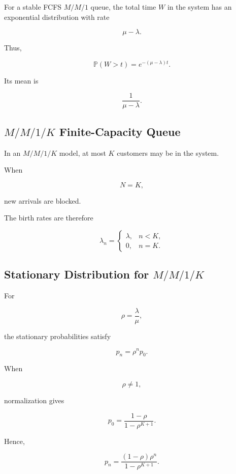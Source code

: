 For a stable FCFS \(M/M/1\) queue, the total time \(W\) in the system has
an exponential distribution with rate

\[
\mu-\lambda.
\]

Thus,

\[
\boxed{
\mathbb{P}(W>t)
=
e^{-(\mu-\lambda)t}.
}
\]

Its mean is

\[
\boxed{
\frac1{\mu-\lambda}.
}
\]

\subsection{\(M/M/1/K\) Finite-Capacity Queue}
\label{subsec:mm1k}

In an \(M/M/1/K\) model, at most \(K\) customers may be in the system.

When

\[
N=K,
\]

new arrivals are blocked.

The birth rates are therefore

\[
\lambda_n
=
\begin{cases}
\lambda,
&
n<K,
\\
0,
&
n=K.
\end{cases}
\]

\subsection{Stationary Distribution for \(M/M/1/K\)}
\label{subsec:mm1k-stationary}

For

\[
\rho
=
\frac{\lambda}{\mu},
\]

the stationary probabilities satisfy

\[
p_n
=
\rho^n p_0.
\]

When

\[
\rho\neq1,
\]

normalization gives

\[
\boxed{
p_0
=
\frac{
1-\rho
}{
1-\rho^{K+1}
}.
}
\]

Hence,

\[
\boxed{
p_n
=
\frac{
(1-\rho)\rho^n
}{
1-\rho^{K+1}
}.
}
\]

